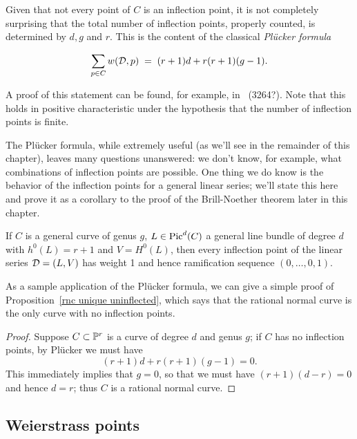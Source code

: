 Given that not every point of $C$ is an inflection point, it is not completely surprising that
the total number of inflection points, properly counted, is determined by $d, g$ and $r$. This is the content of the classical \emph{Pl\"ucker formula}

\begin{theorem}
 \begin{equation}\label{Plucker formula}
\sum_{p \in C} w({\cal D}, p) \; = \; (r+1)d + r(r+1)(g-1).
\end{equation}
\end{theorem}
A proof of this statement can be found, for example, in~\cite{} (3264?). Note that this holds in positive characteristic under the hypothesis that the number of inflection points is finite.

The Pl\"ucker formula, while extremely useful (as we'll see in the remainder of this chapter), leaves many questions unanswered: we don't know, for example, what combinations of inflection points are possible. One thing we do know is the behavior of the inflection points for a general linear series; we'll state this here and prove it as a corollary to the proof of the Brill-Noether theorem later in this chapter.

\begin{theorem}
If $C$ is a general curve of genus $g$, $L \in \operatorname{Pic}^d(C)$ a general line bundle of degree $d$ with $h^0(L) = r+1$ and $V = H^0(L)$, then every inflection point of the linear series ${\cal D} = (L, V)$ has weight 1 and hence ramification sequence $(0, \dots, 0, 1)$.
\end{theorem}

As a sample application of the Pl\"ucker formula, we can give a simple proof of Proposition~\ref{rnc unique uninflected}, which says that the rational normal curve is the only curve with no inflection points. 

\begin{proof}
Suppose $C \subset {\mathbb P}^r$ is a curve of degree $d$ and genus $g$; if $C$ has no inflection points, by Pl\"ucker we must have
$$
(r+1)d + r(r+1)(g-1) = 0.
$$
This immediately implies that $g=0$, so that we must have $(r+1)(d-r) = 0$ and hence $d=r$; thus $C$ is a rational normal curve.
\end{proof}

\subsection{Weierstrass points}

